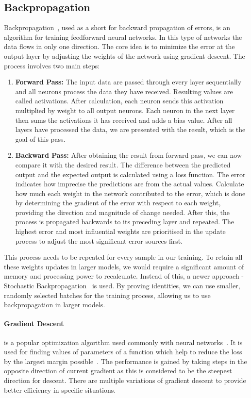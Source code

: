 \subsection{Backpropagation}
Backpropagation~\cite{backprop}, used as a short for backward propagation of errors, is an algorithm for training feedforward neural networks. In this type of networks the data flows in only one direction. The core idea is to minimize the error at the output layer by adjusting the weights of the network using gradient descent. The process involves two main steps:
\begin{enumerate}
	\item \textbf{Forward Pass:} The input data are passed through every layer sequentially and all neurons process the data they have received. Resulting values are called activations. After calculation, each neuron sends this activation multiplied by weight to all output neurons. Each neuron in the next layer then sums the activations it has received and adds a bias value. After all layers have processed the data, we are presented with the result, which is the goal of this pass.
	\item \textbf{Backward Pass:} After obtaining the result from forward pass, we can now compare it with the desired result. The difference between the predicted output and the expected output is calculated using a loss function. The error indicates how imprecise the predictions are from the actual values. Calculate how much each weight in the network contributed to the error, which is done by determining the gradient of the error with respect to each weight, providing the direction and magnitude of change needed. After this, the process is propagated backwards to its preceding layer and repeated. The highest error and most influential weights are prioritised in the update process to adjust the most significant error sources first.
\end{enumerate}
This process needs to be repeated for every sample in our training. To retain all these weights updates in larger models, we would require a significant amount of memory and processing power to recalculate. Instead of this, a newer approach - Stochastic Backpropagation~\cite{stochasticBackpropagation} is used. By proving identities, we can use smaller, randomly selected batches for the training process, allowing us to use backpropagation in larger models.

\paragraph{Gradient Descent} is a popular optimization algorithm used commonly with neural networks~\cite{gradientDescent}. It is used for finding values of parameters of a function which help to reduce the loss by the largest margin possible~\cite{gradientDescentExplain}. The performance is gained by taking steps in the opposite direction of current gradient as this is considered to be the steepest direction for descent. There are multiple variations of gradient descent to provide better efficiency in specific situations.

